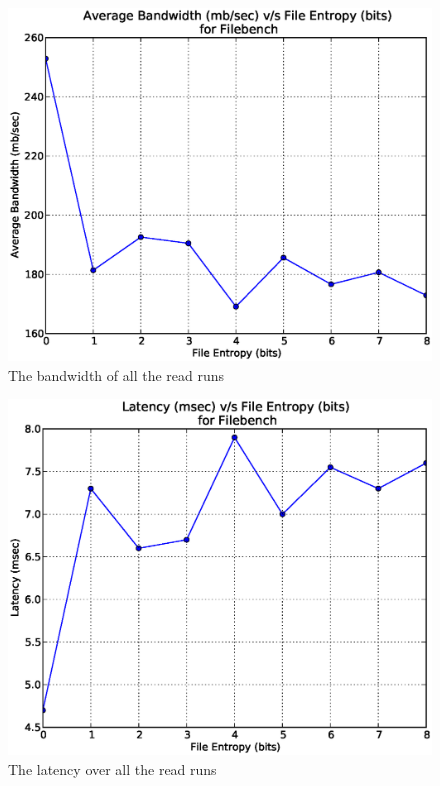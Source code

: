 \begin{figure}
\label{fig:rb}
\begin{center}
\includegraphics[scale=0.55]{../results/read_bw.eps}
\caption{The bandwidth of all the read runs }
\end{center}
\end{figure}

\begin{figure}
\label{fig:rl}
\begin{center}
\includegraphics[scale=.55]{../results/read_latency.eps}
\caption{The latency over all the read runs}
\end{center}
\end{figure}


